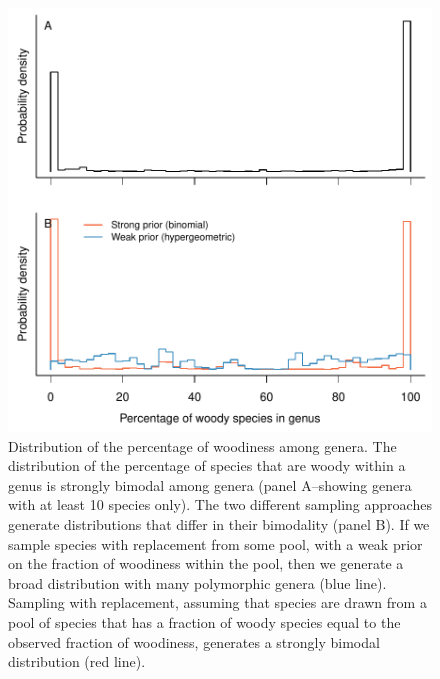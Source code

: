 \begin{figure}[p]
  \centering
  \includegraphics[width=\textwidth]{figs/fraction-by-genus}
  \caption[Distribution of woodiness proportion among genera]{Distribution of the percentage of woodiness among genera.
    The distribution of the percentage of species that are woody within
    a genus is strongly bimodal among genera (panel A--showing
    genera with at least 10 species only).
    The two different sampling approaches generate distributions that
    differ in their bimodality (panel B). If we sample species
    with replacement from some pool, with a weak prior on
    the fraction of woodiness within the pool, then we generate a broad
    distribution with many polymorphic genera (blue line).
    Sampling with replacement, assuming that species are drawn from a
    pool of species that has a fraction of woody species equal to the
    observed fraction of woodiness, generates a strongly bimodal
    distribution (red line).}
  \label{fig:distribution-genera}
\end{figure}

